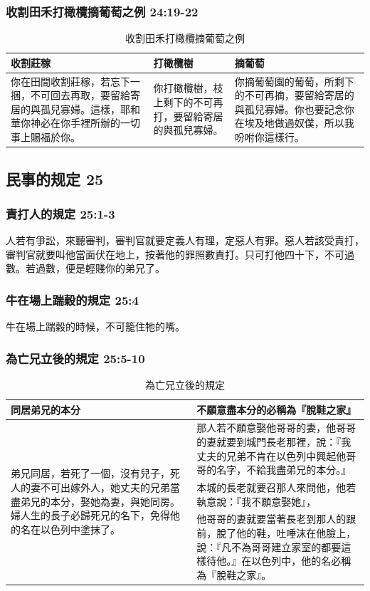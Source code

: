 \subsubsection{收割田禾打橄欖摘葡萄之例 24:19-22}
\begin{table}[H]
\begin{center}
\begin{tabular}{ p{6.5cm}|p{}|p{}} \toprule
收割莊稼&打橄欖樹&摘葡萄\\\hline
你在田間收割莊稼，若忘下一捆，不可回去再取，要留給寄居的與孤兒寡婦。這樣，耶和華你神必在你手裡所辦的一切事上賜福於你。
&你打橄欖樹，枝上剩下的不可再打，要留給寄居的與孤兒寡婦。
&你摘葡萄園的葡萄，所剩下的不可再摘，要留給寄居的與孤兒寡婦。你也要記念你在埃及地做過奴僕，所以我吩咐你這樣行。\\\hline
\end{tabular}
\end{center}
\caption{收割田禾打橄欖摘葡萄之例}
\end{table}

\subsection{民事的规定 25}
\subsubsection{責打人的規定 25:1-3}
人若有爭訟，來聽審判，審判官就要定義人有理，定惡人有罪。惡人若該受責打，審判官就要叫他當面伏在地上，按著他的罪照數責打。只可打他四十下，不可過數。若過數，便是輕賤你的弟兄了。

\subsubsection{牛在場上踹穀的規定 25:4 }
牛在場上踹穀的時候，不可籠住牠的嘴。


\subsubsection{為亡兄立後的規定 25:5-10 }
\begin{table}[H]
\begin{center}
\begin{tabular}{ p{}|p{11.5cm}} \toprule
同居弟兄的本分&不願意盡本分的必稱為『脫鞋之家』\\\hline
\multirow{3}{5cm}{弟兄同居，若死了一個，沒有兒子，死人的妻不可出嫁外人，她丈夫的兄弟當盡弟兄的本分，娶她為妻，與她同房。婦人生的長子必歸死兄的名下，免得他的名在以色列中塗抹了。}
&那人若不願意娶他哥哥的妻，他哥哥的妻就要到城門長老那裡，說：『我丈夫的兄弟不肯在以色列中興起他哥哥的名字，不給我盡弟兄的本分。』\\\cline{2-2}
&本城的長老就要召那人來問他，他若執意說：『我不願意娶她』，\\\cline{2-2}
&他哥哥的妻就要當著長老到那人的跟前，脫了他的鞋，吐唾沫在他臉上，說：『凡不為哥哥建立家室的都要這樣待他。』在以色列中，他的名必稱為『脫鞋之家』。\\\hline
\end{tabular}
\end{center}
\caption{為亡兄立後的規定}
\end{table}




